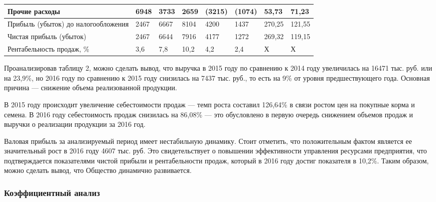 \begin{table}[!hb]
\begin{tabularx}{\textwidth}{|p{4.3cm}|K{1cm}|K{1cm}|K{1cm}|K{1.5cm}|K{1.5cm}|K{1.6cm}|K{1.6cm}|}
		Прочие расходы                      & 6948                      & 3733                      & 2659                      & (3215)               & (1074)               & 53,73                 & 71,23                 \\ \hline
		Прибыль (убыток) до налогообложения & 2467                      & 6667                      & 8104                      & 4200                & 1437                & 270,25              & 121,55                \\ \hline
		Чистая прибыль (убыток)             & 2467                      & 6644                      & 7916                      & 4177                & 1272                & 269,32              & 119,15                \\ \hline
		Рентабельность продаж, \%           & 3,6                       & 7,8                       & 10,2                      & 4,2                 & 2,4                 & Х                     & Х                     \\ \hline
	\end{tabularx}
\end{table}

Проанализировав таблицу 2, можно сделать вывод, что выручка в 2015 году по сравнению к 2014 году увеличилась на 16471 тыс. руб. или на 23,9\%, но 2016
году по сравнению к 2015 году снизилась на 7437 тыс. руб., то есть на 9\% от уровня предшествующего года. Основная причина — снижение объема реализованной продукции.

В 2015 году происходит увеличение себестоимости продаж — темп роста составил 126,64\% в связи ростом цен на покупные корма и семена. В 2016 году себестоимость продаж снизилась на 86,08\% — это обусловлено в первую очередь снижением объемов продаж и выручки о реализации продукции за 2016 год.

Валовая прибыль за анализируемый период имеет нестабильную динамику. Стоит отметить, что положительным фактом является ее значительный рост в 2016 году 4607 тыс. руб. Это свидетельствует о повышении эффективности управления ресурсами предприятия, что подтверждается показателями чистой прибыли и рентабельности продаж, который в 2016 году достиг показателя в 10,2\%. Таким образом, можно сделать вывод, что Общество динамично развивается.

\subsubsection*{Коэффициентный анализ}

